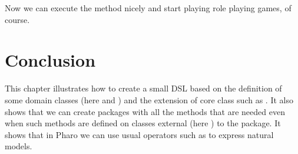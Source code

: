 \documentclass[10pt,twoside,english]{_support/latex/sbabook/sbabook}
\begin{document}
Now we can execute the method  nicely and start playing role playing games, of course.
\section{Conclusion}
This chapter illustrates how to create a small DSL based on the definition of some domain classes (here  and  
 ) and the extension of core class such as . It also shows that we can create packages with all the methods that are needed even when such methods are defined on classes external (here ) to the package.  
It shows that in Pharo we can use usual operators such as \textcode{+} to express natural models.


\backmatter



\end{document}

